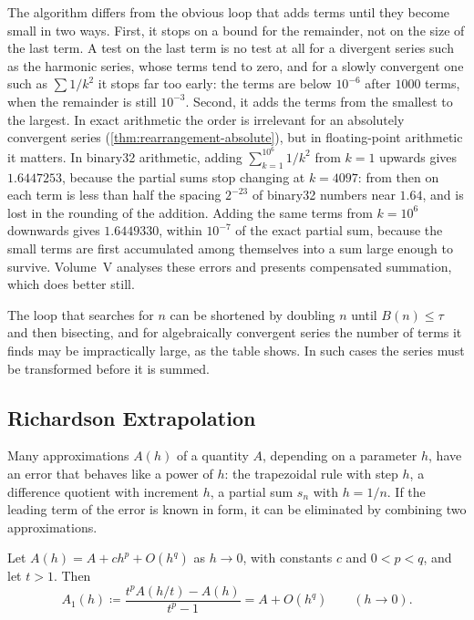 The algorithm differs from the obvious loop that adds terms until they become small in two ways. First, it stops on a bound for the remainder, not on the size of the last term. A test on the last term is no test at all for a divergent series such as the harmonic series, whose terms tend to zero, and for a slowly convergent one such as $\sum1/k^2$ it stops far too early: the terms are below $10^{-6}$ after $1000$ terms, when the remainder is still $10^{-3}$. Second, it adds the terms from the smallest to the largest. In exact arithmetic the order is irrelevant for an absolutely convergent series (\cref{thm:rearrangement-absolute}), but in floating-point arithmetic it matters. In binary32 arithmetic, adding $\sum_{k=1}^{10^6}1/k^2$ from $k=1$ upwards gives $1.6447253$, because the partial sums stop changing at $k=4097$: from then on each term is less than half the spacing $2^{-23}$ of binary32 numbers near $1.64$, and is lost in the rounding of the addition. Adding the same terms from $k=10^6$ downwards gives $1.6449330$, within $10^{-7}$ of the exact partial sum, because the small terms are first accumulated among themselves into a sum large enough to survive. Volume~V analyses these errors and presents compensated summation, which does better still.

The loop that searches for $n$ can be shortened by doubling $n$ until $B(n)\le\tau$ and then bisecting, and for algebraically convergent series the number of terms it finds may be impractically large, as the table shows. In such cases the series must be transformed before it is summed.

\subsection{Richardson Extrapolation}

Many approximations $A(h)$ of a quantity $A$, depending on a parameter $h$, have an error that behaves like a power of $h$: the trapezoidal rule with step $h$, a difference quotient with increment $h$, a partial sum $s_n$ with $h=1/n$. If the leading term of the error is known in form, it can be eliminated by combining two approximations.

\begin{proposition}
\label{prop:richardson}
Let $A(h)=A+ch^p+O(h^q)$ as $h\to0$, with constants $c$ and $0<p<q$, and let $t>1$. Then
\[
A_1(h)\coloneqq\frac{t^pA(h/t)-A(h)}{t^p-1}=A+O(h^q)\qquad(h\to0).
\]
\end{proposition}

